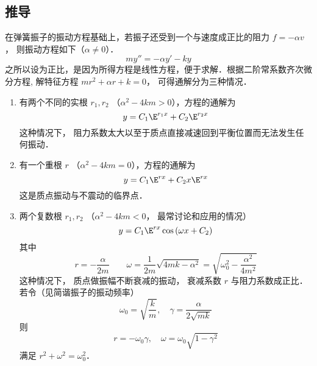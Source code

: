 \subsection{推导}
在弹簧振子的振动方程基础上，若振子还受到一个与速度成正比的阻力 $f =  - \alpha v$， 则振动方程如下（$\alpha \ne 0$）．
\begin{equation}
my'' =  - \alpha y' - ky
\end{equation}
之所以设为正比，是因为所得方程是线性方程，便于求解．根据二阶常系数齐次微分方程,
解特征方程 $m{r^2} + \alpha r + k = 0$， 可得通解分为三种情况．
\begin{enumerate}
\item 有两个不同的实根 $r_1,r_2$ （${\alpha ^2} - 4km > 0$），方程的通解为
\begin{equation}
y = {C_1}{\E^{{r_1}x}} + {C_2}{\E^{{r_2}x}}
\end{equation}
这种情况下， 阻力系数太大以至于质点直接减速回到平衡位置而无法发生任何振动．

\item 有一个重根 $r$ （${\alpha ^2} - 4km = 0$），方程的通解为
\begin{equation}
y = {C_1}{\E^{rx}} + {C_2}x{\E^{rx}}
\end{equation}
这是质点振动与不震动的临界点．

\item 两个复数根 $r_1,r_2$ （${\alpha ^2} - 4km < 0$， 最常讨论和应用的情况）
\begin{equation}
y = {C_1}{\E^{rx}}\cos \left( {\omega x + {C_2}} \right)
\end{equation}
其中
\begin{equation}
r =  - \frac{\alpha }{2m}
\qquad
\omega = \frac{1}{2m}\sqrt {4mk - {\alpha ^2}}  = \sqrt {\omega _0^2 - \frac{{{\alpha ^2}}}{{4{m^2}}}}
\end{equation}
这种情况下， 质点做振幅不断衰减的振动， 衰减系数 $r$ 与阻力系数成正比． 若令（见简谐振子的振动频率）
\begin{equation}
{\omega _0} = \sqrt {\frac{k}{m}},\quad {\gamma  = \frac{\alpha }{2\sqrt{mk}}}
\end{equation}
则 
\begin{equation}
r =  - {\omega _0}\gamma,\quad \omega  = {\omega _0}\sqrt {1 - {\gamma ^2}}
\end{equation}
满足
${r^2} + {\omega ^2} = \omega _0^2$．


\end{enumerate}


